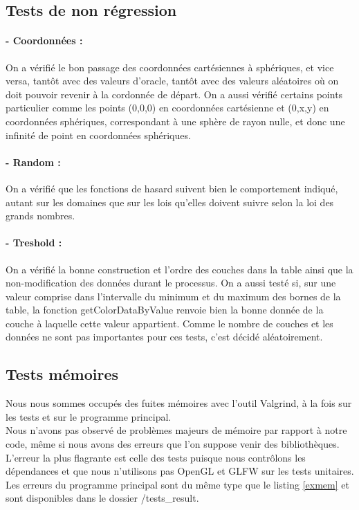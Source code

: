\documentclass[a4paper]{article}
\begin{document}
\subsection{Tests de non régression}

\paragraph{ - Coordonnées : } On a vérifié le bon passage des coordonnées cartésiennes à sphériques, et vice versa, tantôt avec des valeurs d'oracle, tantôt avec des valeurs aléatoires où on doit pouvoir revenir à la cordonnée de départ.
On a aussi vérifié certains points particulier comme les points (0,0,0) en coordonnées cartésienne et (0,x,y) en coordonnées sphériques, correspondant à une sphère de rayon nulle, et donc une infinité de point en coordonnées sphériques. 

\paragraph{- Random :} On a vérifié que les fonctions de hasard suivent bien le comportement indiqué, autant sur les domaines que sur les lois qu'elles doivent suivre selon la loi des grands nombres.

\paragraph{- Treshold :} On a vérifié la bonne construction et l'ordre des couches dans la table ainsi que la non-modification des données durant le processus. 
On a aussi testé si, sur une valeur comprise dans l'intervalle du minimum et du maximum des bornes de la table, la fonction getColorDataByValue renvoie bien la bonne donnée de la couche à laquelle cette valeur appartient.
Comme le nombre de couches et les données ne sont pas importantes pour ces tests, c'est décidé aléatoirement.

\subsection{Tests mémoires}

Nous nous sommes occupés des fuites mémoires avec l'outil Valgrind, à la fois sur les tests et sur le programme principal.\\
Nous n'avons pas observé de problèmes majeurs de mémoire par rapport à notre code, même si nous avons des erreurs que l'on suppose venir des bibliothèques.
L'erreur la plus flagrante est celle des tests puisque nous contrôlons les dépendances et que nous n'utilisons pas OpenGL et GLFW sur les tests unitaires. Les erreurs du programme principal sont du même type que le listing \ref{exmem} et sont disponibles dans le dossier /tests\_result.\\
\end{document}
